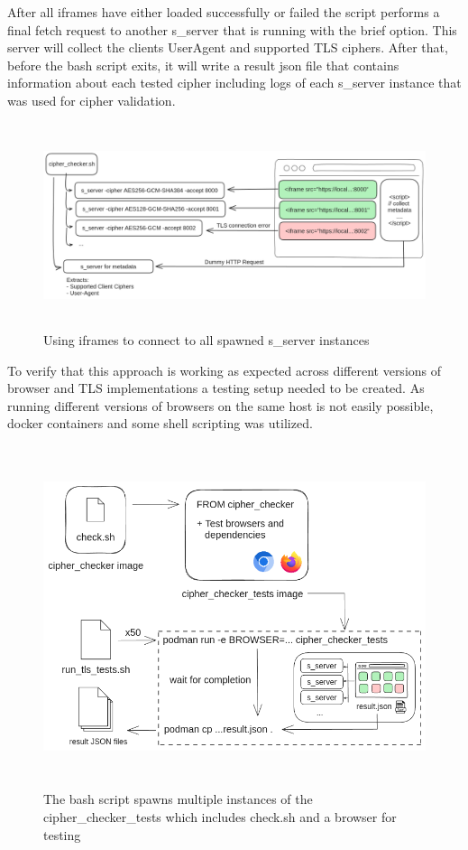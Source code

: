 \documentclass[12pt]{scrbook}
\begin{document}
After all iframes have either loaded successfully or failed the script performs a final fetch request to another
s\_server that is running with the \-brief option. This server will collect the clients User\-Agent and supported TLS ciphers.
After that, before the bash script exits, it will write a result json file that contains information about each tested cipher including logs
of each s\_server instance that was used for cipher validation.

\begin{figure}[!h]
  \centering
  \includegraphics[height=6cm]{./images/cipher_check_setup.png}
  \caption{Using iframes to connect to all spawned s\_server instances}
\end{figure}

To verify that this approach is working as expected across different versions of browser
and TLS implementations a testing setup needed to be created. As running different versions of
browsers on the same host is not easily possible, docker containers and some shell scripting was
utilized.

\begin{figure}[!h]
  \centering
  \includegraphics[height=10cm]{./images/cipher_checker_tests.png}
  \caption{The bash script spawns multiple instances of the cipher\_checker\_tests which includes check.sh and a browser for testing}
\end{figure}
\end{document}

